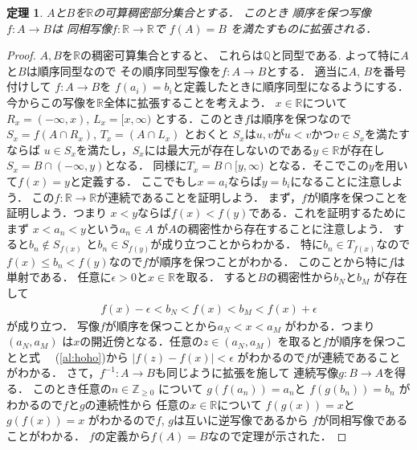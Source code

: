 \documentclass[leqno, a4paper, 12pt]{jsarticle}
\newtheorem{thm}{定理}
\newcommand{\zz}{\mathbb{Z}}
\newcommand{\qq}{\mathbb{Q}}
\newcommand{\rr}{\mathbb{R}}
\begin{document}
\begin{thm}\label{thm:daiji}
$A$と$B$を$\rr$の可算稠密部分集合とする．
このとき
順序を保つ写像
$f: A\to B$は
同相写像$f: \rr\to \rr$で
$f(A)=B$
を満たすものに拡張される．
\end{thm}
\begin{proof}
$A, B$を$\rr$の稠密可算集合とすると、
これらは$\qq$と同型である.
よって特に$A$と$B$は順序同型なので
その順序同型写像を$f: A\to B$とする．
適当に$A$, $B$を番号付けして
$f: A\to B$を
$f(a_{i})=b_{i}$と定義したときに順序同型になるようにする．
今からこの写像を$\rr$全体に拡張することを考えよう．
$x\in \rr$について
$R_{x}=(-\infty, x)$, $L_{x}=[x, \infty)$
とする．このとき$f$は順序を保つなので
$S_{x}=f(A\cap R_{x})$, $T_{x}=(A\cap L_{x})$
とおくと
$S_{x}$は$u, v$が$u<v$かつ$v\in S_{x}$を満たすならば
$u\in S_{x}$を満たし，$S_{x}$には最大元が存在しないのである$y\in \rr$が存在し
$S_{x}=B\cap (-\infty, y)$となる．
同様に$T_{x}=B\cap [y, \infty)$
となる．そこでこの$y$を用いて$f(x)=y$と定義する．
ここでもし$x=a_{i}$ならば$y=b_{i}$になることに注意しよう．
この$f: \rr\to \rr$が連続であることを証明しよう．
まず，$f$が順序を保つことを証明しよう．つまり
$x<y$ならば$f(x)<f(y)$である．これを証明するためにまず
$x<a_{n}<y$という$a_{n}\in A$
が$A$の稠密性から存在することに注意しよう．
すると$b_{n}\not\in S_{f(x)}$
と$b_{n}\in S_{f(y)}$が成り立つことからわかる．
特に$b_{n}\in T_{f(x)}$なので
$f(x)\le b_{n}<f(y)$なので$f$が順序を保つことがわかる．
このことから特に$f$は単射である．
任意に$\epsilon>0$と$x\in \rr$を取る．
すると$B$の稠密性から$b_{N}$と$b_{M}$
が存在して
\begin{align}\label{al:hoho}
f(x)-\epsilon <b_{N}<f(x)<b_{M}<f(x)+\epsilon
\end{align}
が成り立つ．
写像$f$が順序を保つことから$a_{N}<x<a_{M}$
がわかる．つまり$(a_{N}, a_{M})$
は$x$の開近傍となる．任意の$z\in (a_{N}, a_{M})$
を取ると$f$が順序を保つことと式　
(\ref{al:hoho})から
$|f(z)-f(x)|<\epsilon$
がわかるので$f$が連続であることがわかる．
さて，$f^{-1}: A\to B$も同じように拡張を施して
連続写像$g: B\to A$を得る．
このとき任意の$n\in \zz_{\ge 0}$
について
$g(f(a_{n}))=a_{n}$と
$f(g(b_{n}))=b_{n}$
がわかるので$f$と$g$の連続性から
任意の$x\in \rr$について
$f(g(x))=x$と$g(f(x))=x$
がわかるので$f$,
 $g$は互いに逆写像であるから
 $f$が同相写像であることがわかる．
$f$の定義から$f(A)=B$なので定理が示された．
\end{proof}
\end{document}
